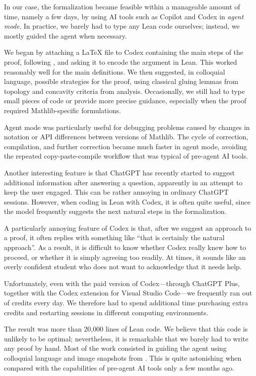 \documentclass[11pt]{amsart}
\begin{document}
In our case, the formalization became feasible within a manageable amount of time, namely a few days, by using AI tools such as Copilot and Codex in {\it agent mode}. In practice, we barely had to type any Lean code ourselves; instead, we mostly guided the agent when necessary.

We began by attaching a LaTeX file to Codex containing the main steps of the proof, following \cite{zbMATH03903326}, and asking it to encode the argument in Lean. This worked reasonably well for the main definitions. We then suggested, in colloquial language, possible strategies for the proof, using classical gluing lemmas from topology and concavity criteria from analysis. Occasionally, we still had to type small pieces of code or provide more precise guidance, especially when the proof required Mathlib-specific formulations.

Agent mode was particularly useful for debugging problems caused by changes in notation or API differences between versions of Mathlib. The cycle of correction, compilation, and further correction became much faster in agent mode, avoiding the repeated copy-paste-compile workflow that was typical of pre-agent AI tools.

Another interesting feature is that ChatGPT has recently started to suggest additional information after answering a question, apparently in an attempt to keep the user engaged. This can be rather annoying in ordinary ChatGPT sessions. However, when coding in Lean with Codex, it is often quite useful, since the model frequently suggests the next natural steps in the formalization.

A particularly annoying feature of Codex is that, after we suggest an approach to a proof, it often replies with something like ``that is certainly the natural approach''. As a result, it is difficult to know whether Codex really knew how to proceed, or whether it is simply agreeing too readily. At times, it sounds like an overly confident student who does not want to acknowledge that it needs help.

Unfortunately, even with the paid version of Codex---through ChatGPT Plus, together with the Codex extension for Visual Studio Code---we frequently ran out of credits every day. We therefore had to spend additional time purchasing extra credits and restarting sessions in different computing environments.

The result was more than 20,000 lines of Lean code. We believe that this code is unlikely to be optimal; nevertheless, it is remarkable that we barely had to write any proof by hand. Most of the work consisted in guiding the agent using colloquial language and image snapshots from \cite{zbMATH03903326}. This is quite astonishing when compared with the capabilities of pre-agent AI tools only a few months ago.

\nocite{zbMATH03903326}


\end{document}
